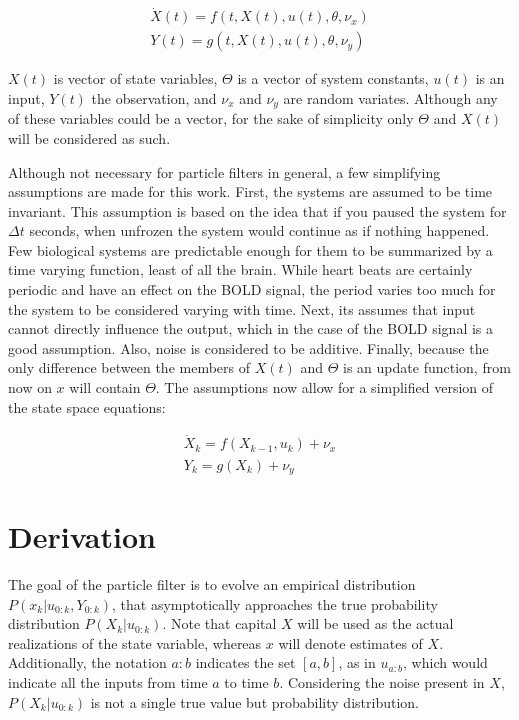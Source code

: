 \begin{eqnarray}
\dot{X}(t) = f(t, X(t), u(t), \theta, \nu_x) \nonumber \\
Y(t) = g(t, X(t), u(t), \theta, \nu_y)
\label{eq:GenericNonlinear}
\end{eqnarray}

$X(t)$ is vector of state variables, $\Theta$ is a vector of system
constants, $u(t)$ is an input, $Y(t)$ the observation, and
$\nu_x$ and $\nu_y$ are random variates. Although any of these
variables could be a vector, for the sake of simplicity only
$\Theta$ and $X(t)$ will be considered as such. 

Although not necessary for particle filters in general, a few  simplifying
assumptions are made for this work. First, the systems are assumed to be 
time invariant. This 
assumption is based on the idea that if you paused the system for $\Delta t$
seconds, when unfrozen the system would continue as if nothing happened. 
Few biological systems are predictable enough for them to be summarized
by a time varying function, least of all the brain. While heart beats are certainly
periodic and have an effect on the BOLD signal, the period varies too much
for the system to be considered varying with time. 
Next, its assumes that input cannot directly
influence the output, which in the case of the BOLD signal is a good assumption.
Also, noise is considered to be additive.
Finally, because the only difference between the members of $X(t)$ and 
$\Theta$ is an update function, from now on $x$ will contain 
$\Theta$. The assumptions now allow for a simplified version of the
state space equations:

\begin{eqnarray}
\dot{X}_k = f(X_{k-1}, u_k) + \nu_x 
\label{eq:stateass}\\
Y_k = g(X_k) + \nu_y 
\label{eq:measass}
\end{eqnarray}

\section{Derivation}
The goal of the particle filter is to evolve an empirical distribution 
$P(x_k | u_{0:k}, Y_{0:k})$,
that asymptotically approaches the true probability distribution $P(X_k | u_{0:k})$.
Note that capital $X$ will be used as the actual realizations of 
the state variable, whereas $x$ will denote estimates of $X$.
Additionally, the notation $a:b$ indicates the set $[a,b]$,
as in $u_{a:b}$, which would indicate all the inputs from time $a$ to time $b$.
Considering the noise present in $X$,
 $P(X_k | u_{0:k})$ is not a single true value but probability distribution. 

